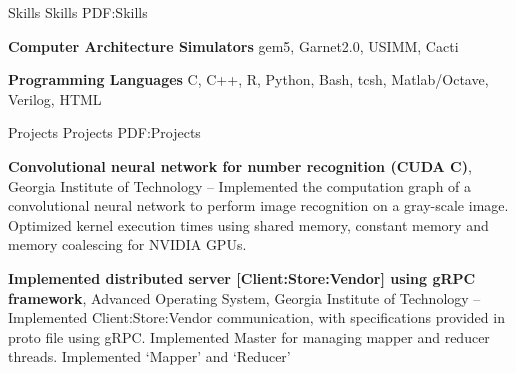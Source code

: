 \documentclass[letterpaper,MMMyyyy,nonstopmode]{simpleresumecv}
\begin{document}
\begin{Body}
\Section
{Skills}
{Skills}
{PDF:Skills}

\Entry
{\textbf{Computer Architecture Simulators}}
\Gap
\BulletItem
gem5, Garnet2.0, USIMM, Cacti

\Entry
{\textbf{Programming Languages}}
\Gap
\BulletItem
C, C++, R, Python, Bash, tcsh, Matlab/Octave, Verilog, HTML

%
%
%
%


\Section
{Projects}
{Projects}
{PDF:Projects}

\Entry
{\textbf{Convolutional neural network for number recognition (CUDA C)}},
\newline
Georgia Institute of Technology
\hfill
{} --
\BulletItem
Implemented the computation graph of a convolutional neural network to perform image recognition on a gray-scale image.
\BulletItem
Optimized kernel execution times using shared memory, constant memory and memory coalescing for NVIDIA GPUs.


\BigGap
\Entry
{\textbf{Implemented distributed server [Client:Store:Vendor] using gRPC framework}},
\newline
Advanced Operating System, Georgia Institute of Technology
\hfill
{} --
\BulletItem
Implemented Client:Store:Vendor communication, with specifications provided in proto file using gRPC.
\BulletItem
Implemented Master for managing mapper and reducer threads. Implemented `Mapper’ and `Reducer’


\end{Body}
\end{document}
